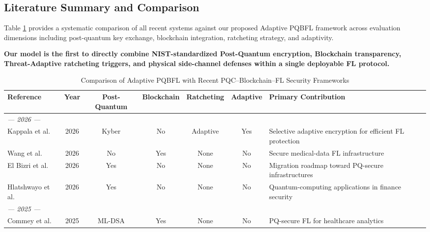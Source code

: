 \documentclass[journal, 10pt, twocolumn]{IEEEtran}
\begin{document}
\subsection{Literature Summary and Comparison}
\label{subsec:lit_comparison}

Table \ref{tab:lit_survey} provides a systematic comparison of all recent systems against our proposed Adaptive PQBFL framework across evaluation dimensions including post-quantum key exchange, blockchain integration, ratcheting strategy, and adaptivity. 

\textbf{Our model is the first to directly combine NIST-standardized Post-Quantum encryption, Blockchain transparency, Threat-Adaptive ratcheting triggers, and physical side-channel defenses within a single deployable FL protocol.}

\begin{table}[htbp]
\centering
\caption{Comparison of Adaptive PQBFL with Recent PQC–Blockchain–FL Security Frameworks}
\label{tab:lit_survey}

\footnotesize
\renewcommand{\arraystretch}{1.2}

\begin{tabularx}{\textwidth}{l c c c c c X}
\toprule
\textbf{Reference} & \textbf{Year} & \textbf{Post-Quantum} & \textbf{Blockchain} & \textbf{Ratcheting} & \textbf{Adaptive} & \textbf{Primary Contribution} \\
\midrule

\multicolumn{7}{l}{\textit{--- 2026 ---}} \\

Kappala et al. \cite{kappala2026}
& 2026 & Kyber & No & Adaptive & Yes
& Selective adaptive encryption for efficient FL protection \\

Wang et al. \cite{wang2026}
& 2026 & No & Yes & None & No
& Secure medical-data FL infrastructure \\

El Bizri et al. \cite{elbizri2026}
& 2026 & Yes & No & None & No
& Migration roadmap toward PQ-secure infrastructures \\

Hlatshwayo et al. \cite{hlatshwayo2026}
& 2026 & Yes & No & None & No
& Quantum-computing applications in finance security \\

\multicolumn{7}{l}{\textit{--- 2025 ---}} \\

Commey et al. \cite{commey2025_pqsbfl}
& 2025 & ML-DSA & Yes & None & No
& PQ-secure FL for healthcare analytics \\


\end{tabularx}
\end{table}
\end{document}
